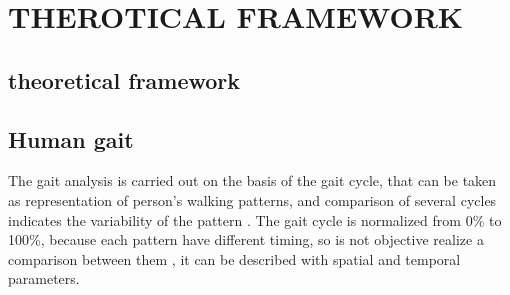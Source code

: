 \chapter{THEROTICAL FRAMEWORK}\label{introduction}
\graphicspath{{images/}}


\section{theoretical framework}\label{framework}

\section{Human gait}

The gait analysis is carried out on the basis of the gait cycle, that can be taken as representation of person's walking patterns, and comparison of several cycles indicates the variability of the pattern \cite{Baker2013}. The gait cycle is normalized from 0\% to 100\%, because each pattern have different timing, so is not objective realize a comparison between them \cite{Medved2021}, it can be described with spatial and temporal parameters. 



